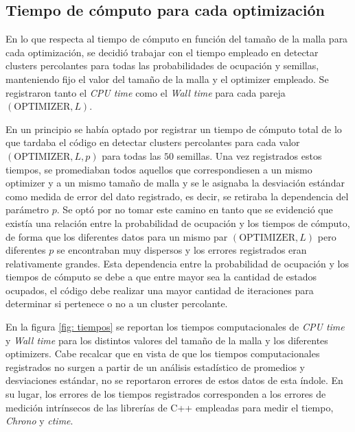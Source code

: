 \documentclass[%
 reprint,
 amsmath,amssymb,
 aps,
]{revtex4-2}
\begin{document}
\subsection{Tiempo de cómputo para cada optimización}

En lo que respecta al tiempo de cómputo en función del tamaño de la malla para cada optimización, se decidió trabajar con el tiempo empleado en detectar clusters percolantes para todas las probabilidades de ocupación y semillas, manteniendo fijo el valor del tamaño de la malla y el optimizer empleado. Se registraron tanto el \textit{CPU time} como el \textit{Wall time} para cada pareja $(\mathrm{OPTIMIZER}, L)$. 
\vspace{0.2 cm}

En un principio se había optado por registrar un tiempo de cómputo total de lo que tardaba el código en detectar clusters percolantes para cada valor $(\mathrm{OPTIMIZER}, L, p)$ para todas las $50$ semillas. Una vez registrados estos tiempos, se promediaban todos aquellos que correspondiesen a un mismo optimizer y a un mismo tamaño de malla y se le asignaba la desviación estándar como medida de error del dato registrado, es decir, se retiraba la dependencia del parámetro $p$. Se optó por no tomar este camino en tanto que se evidenció que existía una relación entre la probabilidad de ocupación y los tiempos de cómputo, de forma que los diferentes datos para un mismo par $(\mathrm{OPTIMIZER}, L)$ pero diferentes $p$ se encontraban muy dispersos y los errores registrados eran relativamente grandes. Esta dependencia entre la probabilidad de ocupación y los tiempos de cómputo se debe a que entre mayor sea la cantidad de estados ocupados, el código debe realizar una mayor cantidad de iteraciones para determinar si pertenece o no a un cluster percolante.
\vspace{0.2 cm}

En la figura \ref{fig: tiempos} se reportan los tiempos computacionales de \textit{CPU time} y \textit{Wall time} para los distintos valores del tamaño de la malla y los diferentes optimizers. Cabe recalcar que en vista de que los tiempos computacionales registrados no surgen a partir de un análisis estadístico de promedios y desviaciones estándar, no se reportaron errores de estos datos de esta índole. En su lugar, los errores de los tiempos registrados corresponden a los errores de medición intrínsecos de las librerías de C++ empleadas para medir el tiempo, \textit{Chrono} y \textit{ctime}.
\end{document}
